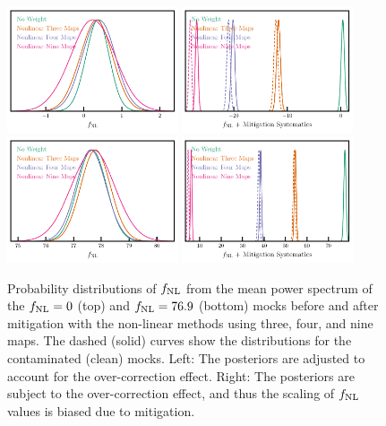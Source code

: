 \begin{figure}
\centering
\includegraphics[width=0.45\textwidth]{figures/mcmc_cont.pdf}
\includegraphics[width=0.45\textwidth]{figures/mcmc_contnoshift.pdf}
\includegraphics[width=0.45\textwidth]{figures/mcmcp_cont.pdf}
\includegraphics[width=0.45\textwidth]{figures/mcmcp_contnoshift.pdf}
\caption{Probability distributions of $f_{\rm NL}$ from the mean power spectrum of the $f_{\rm NL}=0$ (top) and $f_{\rm NL}=76.9$ (bottom) mocks before and after mitigation with the non-linear methods using three, four, and nine maps. The dashed (solid) curves show the distributions for the contaminated (clean) mocks. Left: The posteriors are adjusted to account for the over-correction effect. Right: The posteriors are subject to the over-correction effect, and thus the scaling of $f_{\rm NL}$ values is biased due to mitigation.}\label{fig:contmcmc}
\end{figure}
